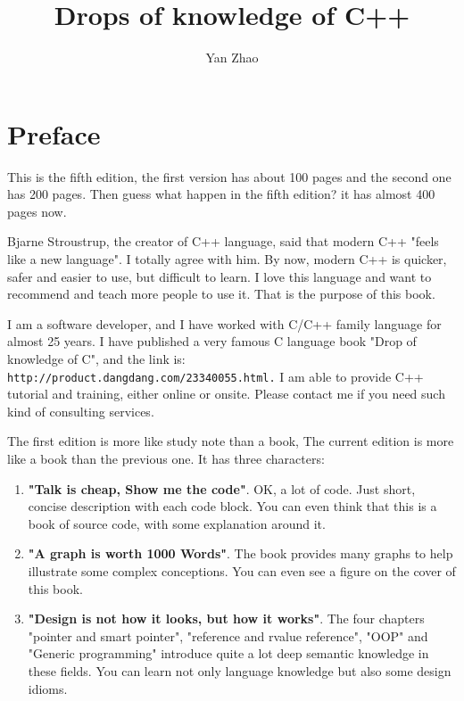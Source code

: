 \documentclass[a4paper,11pt,twoside]{book}
\begin{document}
\title{Drops of knowledge of C++}
\author{Yan Zhao}
\date{}\maketitle

\setcounter{secnumdepth}{4}
\setcounter{tocdepth}{4}
\tableofcontents

\chapter*{Preface}
This is the fifth edition, the first version has about 100 pages and the second one has 200 pages. Then guess what happen in the fifth edition? it has almost 400 pages now. \par \medskip

Bjarne Stroustrup, the creator of C++ language, said that modern C++  "feels like a new language". I totally agree with him. By now, modern C++ is quicker, safer and easier to use, but difficult to learn. I love this language and want to recommend and teach more people to use it. That is the purpose of this book.  \par \medskip

I am a software developer, and I have worked with C/C++ family language for almost 25 years. I have published a very famous C language book "Drop of knowledge of C", and the link is:\\ \verb|http://product.dangdang.com/23340055.html.| I am able to provide C++ tutorial and training, either online or onsite. Please contact me if you need such kind of consulting services.\par \par \medskip

The first edition is more like study note than a book, The current edition is more like a book than the previous one. It has three characters:
\begin{enumerate}
	\item \textbf{"Talk is cheap, Show me the code"}. OK, a lot of code. Just short, concise description with each code block. You can even think that this is a book of source code, with some explanation around it.
	
	\item \textbf{"A graph is worth 1000 Words"}. The book provides many graphs to help illustrate some complex conceptions. You can even see a figure on the cover of this book.
	
	\item \textbf{"Design is not how it looks, but how it works"}. The four chapters "pointer and smart pointer", "reference and rvalue reference", "OOP" and "Generic programming" introduce quite a lot deep semantic knowledge in these fields. You can learn not only language knowledge but also some design idioms.
\end{enumerate}
\end{document}
